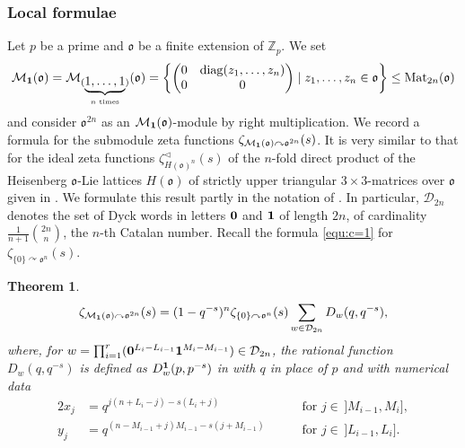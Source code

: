 \documentclass[11pt]{amsart}
\numberwithin{equation}{section}
\numberwithin{figure}{section}
\theoremstyle{plain}
\newtheorem{theorem}{Theorem}[section]
\theoremstyle{definition}
\theoremstyle{remark}
\begin{document}
\subsubsection{Local formulae}\label{subsec:abelian.local}
Let $p$ be a prime and ${\mathfrak o}$ be a finite extension of ${\ensuremath{\mathbb{Z}_p}}$. We set
\begin{equation}\label{equ:bfo}
  {\mathcal{M}}_{{\bf 1}}({\mathfrak o}) = {\mathcal{M}}_{(\underbrace{1,\dots,1}_{n \textup{ times}})}({\mathfrak o}) = \left\{
    \left( \begin{matrix}0&\operatorname{diag}(z_1,\dots,z_n)\\0&0\end{matrix}\right)\mid
    z_1,\dots,z_n\in{\mathfrak o}\right\}\leq \operatorname{Mat}_{2n}({\mathfrak o})
\end{equation} 
and consider ${\mathfrak o}^{2n}$ as an ${\mathcal{M}}_{{\bf 1}}({\mathfrak o})$-module by right
multiplication.  We record a formula for the submodule zeta functions
$\zeta_{{\mathcal{M}}_{{\bf 1}}({\mathfrak o}) {\curvearrowright} {\mathfrak o}^{2n}}(s)$. It is very similar to
that for the ideal zeta functions $\zeta^{\triangleleft}_{H({\mathfrak o})^{n}}(s)$ of
the $n$-fold direct product of the Heisenberg ${\mathfrak o}$-Lie lattices
$H({\mathfrak o})$ of strictly upper triangular $3\times3$-matrices over ${\mathfrak o}$
given in \cite[Theorem~3.1]{SV1/15}.  We formulate this result partly
in the notation of \cite{SV1/15}. In particular, ${\mathcal{D}}_{2n}$ denotes
the set of Dyck words in letters ${{\bf 0}}$ and ${{\bf 1}}$ of length $2n$, of
cardinality $\frac{1}{n+1}\binom{2n}{n}$, the $n$-th Catalan
number. Recall the formula \eqref{equ:c=1} for $\zeta_{\{0\} {\curvearrowright}
  {\mathfrak o}^n}(s)$.

\begin{theorem}\label{thm:abelian.tot.split}
  \begin{equation*}
    \zeta_{{\mathcal{M}}_{{\bf 1}}({\mathfrak o}){\curvearrowright} {\mathfrak o}^{2n}}(s) = (1-q^{-s})^n
    \zeta_{\{0\} {\curvearrowright} {\mathfrak o}^n}(s) \sum_{w\in {\mathcal{D}}_{2n}} D_w(q,q^{-s}),
  \end{equation*} 
  where, for $w = \prod_{i=1}^r ( {{\bf 0}}^{L_i - L_{i-1}}
  {{\bf 1}}^{M_i-M_{i-1}})\in{\mathcal{D}}_{2n}$, the rational function
  $D_w(q,q^{-s})$ is defined as $D_w^{{\bf 1}}(p,p^{-s})$ in
  \cite[Theorem~3.1]{SV1/15} with $q$ in place of $p$ and with
  numerical data
\begin{alignat*}{2}
  x_j & = q^{j(n + L_i - j)-s(L_i + j)} &&\quad\text{ for } j
  \in \,]M_{i-1}, M_i] ,\\ y_j & = q^{(n -M_{i-1} + j)M_{i-1}-s(j +
    M_{i-1})} &&\quad\text{ for } j \in \,]L_{i-1}, L_i].
\end{alignat*}
\end{theorem}
\end{document}

